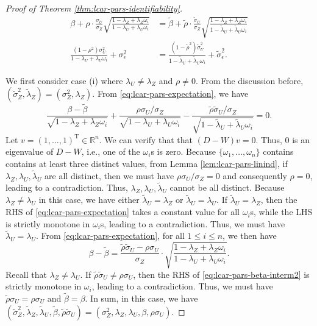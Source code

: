 \documentclass[11pt]{article}
\theoremstyle{definition}
\theoremstyle{remark}
\def\top{{ \mathrm{\scriptscriptstyle T} }}
\begin{document}
\begin{proof}[Proof of Theorem \ref{thm:lcar-pars-identifiability}]
\begin{align}
\label{eq:lcar-pars-expectation}
\beta + \rho \cdot \frac{\sigma_U}{\sigma_Z} \sqrt{\frac{1-\lambda_Z + \lambda_Z \omega_i}{1-\lambda_U + \lambda_U \omega_i}} & = \tilde\beta + \tilde\rho \cdot \frac{\tilde\sigma_U}{\sigma_Z} \sqrt{\frac{1-\lambda_Z + \lambda_Z \omega_i}{1-\tilde\lambda_U + \tilde\lambda_U \omega_i}}
\\
\label{eq:lcar-pars-condvar}
\frac{(1-\rho^2)\sigma_U^2}{1-\lambda_U + \lambda_U\omega_i} + \sigma_\epsilon^2 & = \frac{(1-\tilde\rho^2)\tilde\sigma_U^2}{1-\tilde\lambda_U + \tilde\lambda_U\omega_i} + \tilde\sigma_\epsilon^2.
\end{align}



We first consider case (i) where
$\lambda_U\neq \lambda_Z$ and $\rho\neq 0$. From the discussion before, $(\tilde\sigma_Z^2, \tilde\lambda_Z) = (\sigma_Z^2, \lambda_Z)$. From \eqref{eq:lcar-pars-expectation}, we have 
\[\frac{\beta-\tilde\beta}{\sqrt{1-\lambda_Z+\lambda_Z\omega_i}} + \frac{\rho\sigma_U/\sigma_Z}{\sqrt{1-\lambda_U + \lambda_U \omega_i}} - \frac{\tilde\rho \tilde\sigma_U/\sigma_Z}{\sqrt{1-\tilde\lambda_U + \tilde\lambda_U \omega_i}} = 0.\]
Let $v = (1,\ldots,1)^\top \in \mathbb{R}^n$. We can verify that that $(D-W)v=0$. Thus, $0$ is an eigenvalue of $D-W$, i.e., one of the $\omega_i$s is zero. Because $\{\omega_1, \ldots, \omega_n\}$ contains contains at least three distinct values, from Lemma \ref{lem:lcar-pars-linind}, if $\lambda_Z, \lambda_U, \tilde\lambda_U$ are all distinct, then we must have $\rho\sigma_U/\sigma_Z=0$ and consequently $\rho =0$, leading to a contradiction. Thus, $\lambda_Z, \lambda_U, \tilde\lambda_U$ cannot be all distinct. Because $\lambda_Z\neq \lambda_U$ in this case, we have  either $\tilde\lambda_U = \lambda_Z$ or $\tilde\lambda_U = \lambda_U$. If $\tilde\lambda_U=\lambda_Z$, then the RHS of \eqref{eq:lcar-pars-expectation} takes a constant value for all $\omega_i$s, while the LHS is strictly monotone in $\omega_i$s, leading to a contradiction. Thus, we must have $\tilde\lambda_U=\lambda_U$. 
From \eqref{eq:lcar-pars-expectation}, for all $1\le i \le n$, we then have 
\begin{equation}\label{eq:lcar-pars-beta-interm2}
\beta-\tilde\beta = \frac{\tilde\rho\tilde\sigma_U - \rho\sigma_U}{\sigma_Z}\cdot \sqrt{\frac{1-\lambda_Z + \lambda_Z \omega_i}{1-\lambda_U + \lambda_U \omega_i}}.
\end{equation} 
Recall that $\lambda_Z\neq\lambda_U$. If $\tilde\rho\tilde\sigma_U \neq \rho\sigma_U$, then the RHS of \eqref{eq:lcar-pars-beta-interm2} is strictly monotone in $\omega_i$, leading to a contradiction. Thus, we must have $\tilde\rho \sigma_U = \rho\sigma_U$ and $\tilde\beta=\beta$.
In sum, in this case, we have 
$(\tilde\sigma_Z^2, \tilde\lambda_Z, \tilde\lambda_U, \tilde\beta, \tilde\rho \tilde\sigma_U) = (\sigma_Z^2, \lambda_Z, \lambda_U, \beta, \rho \sigma_U)$. 




\end{proof}
\end{document}
